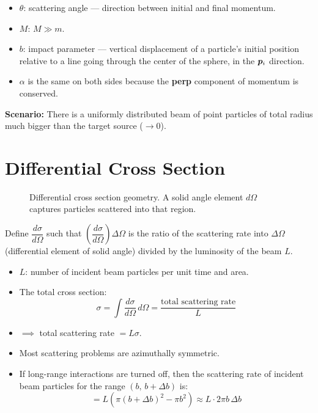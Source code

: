 \begin{itemize}
    \item $\theta$: scattering angle --- direction between initial and final momentum.
    \item $M$: $M \gg m$.
    \item $b$: impact parameter --- vertical displacement of a particle's initial position relative to a line going through the center of the sphere, in the $\bm{p}_i$ direction.
    \item $\alpha$ is the same on both sides because the \textbf{perp} component of momentum is conserved.
\end{itemize}

\textbf{Scenario:} There is a uniformly distributed beam of point particles of total radius much bigger than the target source ($\to 0$).

\section{Differential Cross Section}

\begin{figure}[H]
    \centering
    \caption{Differential cross section geometry. A solid angle element $d\Omega$ captures particles scattered into that region.}
\end{figure}

Define $\dfrac{d\sigma}{d\Omega}$ such that $\left(\dfrac{d\sigma}{d\Omega}\right)\Delta\Omega$ is the ratio of the scattering rate into $\Delta\Omega$ (differential element of solid angle) divided by the luminosity of the beam $L$.

\begin{itemize}
    \item $L$: number of incident beam particles per unit time and area.
    \item The total cross section:
    \[
        \sigma = \int \frac{d\sigma}{d\Omega}\,d\Omega = \frac{\text{total scattering rate}}{L}
    \]
    \item $\implies$ total scattering rate $= L\sigma$.
    \item Most scattering problems are azimuthally symmetric.
    \item If long-range interactions are turned off, then the scattering rate of incident beam particles for the range $(b,\, b+\Delta b)$ is:
    \[
        = L\left(\pi(b+\Delta b)^2 - \pi b^2\right) \approx L \cdot 2\pi b\,\Delta b
    \]
\end{itemize}

